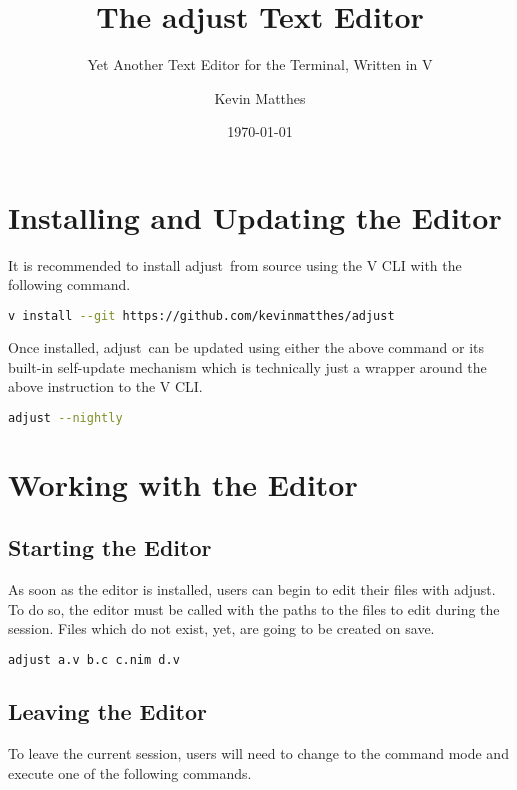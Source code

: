 \documentclass[11pt, a4paper, british]{scrartcl}
\author{Kevin Matthes}
\date{\today}
\subtitle{Yet Another Text Editor for the Terminal, Written in V}
\title{The adjust Text Editor}
\DeclareRobustCommand{\adjust}{\textsf{adjust}}
\begin{document}
\maketitle
\tableofcontents

\section{Installing and Updating the Editor}
\label{sec:installing-and-updating}
It is recommended to install \adjust\ from source using the V CLI with the
following command.

\begin{lstlisting}[caption = Installing \adjust\ from source, language = bash]
v install --git https://github.com/kevinmatthes/adjust
\end{lstlisting}

Once installed, \adjust\ can be updated using either the above command or
its built-in self-update mechanism which is technically just a wrapper around
the above instruction to the V CLI.

\begin{lstlisting}[caption = Updating \adjust, language = bash]
adjust --nightly
\end{lstlisting}

\section{Working with the Editor}
\label{sec:working}
\subsection{Starting the Editor}
\label{sec:working:starting}
As soon as the editor is installed, users can begin to edit their files with
\adjust.  To do so, the editor must be called with the paths to the files to
edit during the session.  Files which do not exist, yet, are going to be created
on save.

\begin{lstlisting}[caption = Starting \adjust, language = bash]
adjust a.v b.c c.nim d.v
\end{lstlisting}

\subsection{Leaving the Editor}
\label{sec:working:leaving}
To leave the current session, users will need to change to the command mode and
execute one of the following commands.
\end{document}
